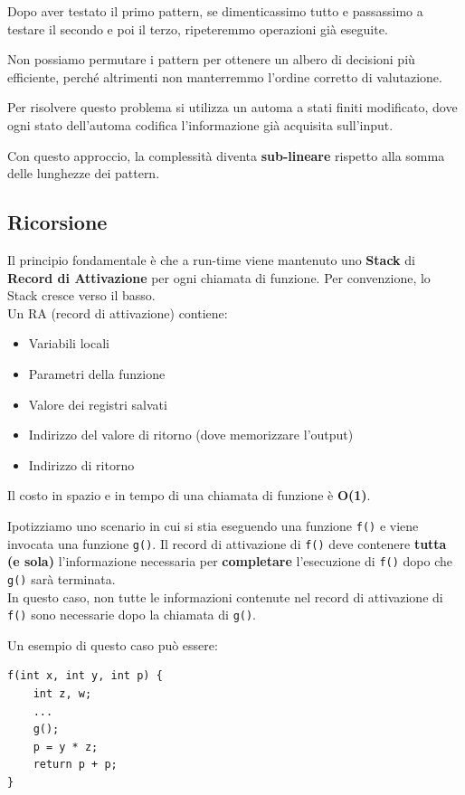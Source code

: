 \documentclass{article}
\begin{document}
Dopo aver testato il primo pattern, se dimenticassimo tutto e passassimo a testare il secondo e poi il terzo, ripeteremmo operazioni già eseguite.

Non possiamo permutare i pattern per ottenere un albero di decisioni più efficiente, perché altrimenti non manterremmo l'ordine corretto di valutazione.

Per risolvere questo problema si utilizza un automa a stati finiti modificato, dove ogni stato dell'automa codifica l'informazione già acquisita sull'input.

Con questo approccio, la complessità diventa \textbf{sub-lineare} rispetto alla somma delle lunghezze dei pattern.

\subsection*{Ricorsione}
Il principio fondamentale è che a run-time viene mantenuto uno \textbf{Stack} di \textbf{Record di Attivazione} per ogni chiamata di funzione. Per convenzione, lo Stack cresce verso il basso.\\
Un RA (record di attivazione) contiene:
\begin{itemize}
    \item Variabili locali
    \item Parametri della funzione
    \item Valore dei registri salvati
    \item Indirizzo del valore di ritorno (dove memorizzare l'output)
    \item Indirizzo di ritorno
\end{itemize}

Il costo in spazio e in tempo di una chiamata di funzione è \textbf{O(1)}.

Ipotizziamo uno scenario in cui si stia eseguendo una funzione \texttt{f()} e viene invocata una funzione \texttt{g()}. Il record di attivazione di \texttt{f()} deve contenere \textbf{tutta (e sola)} l'informazione necessaria per \textbf{completare} l'esecuzione di \texttt{f()} dopo che \texttt{g()} sarà terminata.\\
In questo caso, non tutte le informazioni contenute nel record di attivazione di \texttt{f()} sono necessarie dopo la chiamata di \texttt{g()}.

Un esempio di questo caso può essere:

\begin{verbatim}
f(int x, int y, int p) {
    int z, w;
    ...
    g();
    p = y * z;
    return p + p;
}
\end{verbatim}
\end{document}
